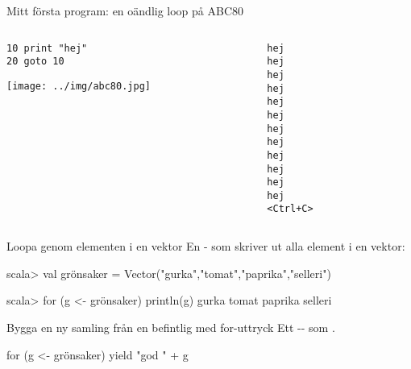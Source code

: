 \begin{Slide}{Mitt första program: en oändlig loop på ABC80}
\begin{columns}
\begin{column}{0.8\textwidth}
\begin{verbatim}
10 print "hej"
20 goto 10
\end{verbatim}
\texttt{[image: ../img/abc80.jpg]}
\end{column}
\begin{column}{0.3\textwidth}
\pause
\begin{verbatim}
hej
hej
hej
hej
hej
hej
hej
hej
hej
hej
hej
hej
<Ctrl+C>
\end{verbatim}

\end{column}
\end{columns}
\end{Slide}


\begin{Slide}{Loopa genom elementen i en vektor}
En - som skriver ut alla element i en vektor:
\begin{REPL}
scala> val grönsaker = Vector("gurka","tomat","paprika","selleri")

scala> for (g <- grönsaker) println(g)
gurka
tomat
paprika
selleri

\end{REPL}

\end{Slide}


\begin{Slide}{Bygga en ny samling från en befintlig med for-uttryck}
Ett -- som .

\begin{Code}[basicstyle=\ttfamily\fontsize{12}{14}\selectfont]
for (g <- grönsaker) yield "god " + g
\end{Code}


\end{Slide}


